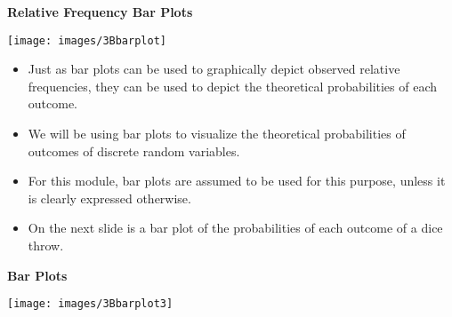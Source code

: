 \documentclass[]{report}
\begin{document}
{
\textbf{Relative Frequency Bar Plots}

\begin{center}
\texttt{[image: images/3Bbarplot]}
\end{center}
\begin{itemize}
\item  Just as bar plots can be used to graphically depict observed relative frequencies, they can be used to
depict the theoretical probabilities of each outcome.
\item  We will be using bar plots to visualize the theoretical probabilities of outcomes of discrete random variables.
\item  For this module, bar plots are assumed to be used for this purpose, unless it is clearly expressed otherwise.
\item  On the next slide is a bar plot of the probabilities of each outcome of a dice throw.
\end{itemize}


\textbf{Bar Plots}
\begin{center}
\texttt{[image: images/3Bbarplot3]}
\end{center}
}
\end{document}
